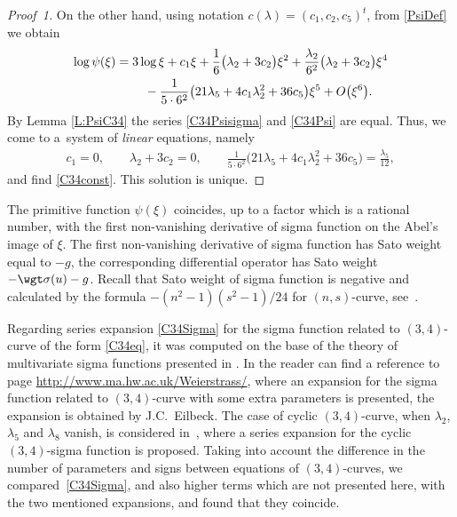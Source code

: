 \begin{proof}[Proof~1]
On the other hand, using notation $c(\lambda)=(c_1,c_2,c_5)^t$, from \eqref{PsiDef} we obtain
\begin{gather}
 \log \psi(\xi) = 3 \log \xi + c_1 \xi + \frac{1}{6} \big(\lambda_2+3c_2 \big) \xi^2
 + \frac{\lambda_2}{6^2} \big(\lambda_2+3 c_2 \big) \xi^4\nonumber\\
 \hphantom{\log \psi(\xi) =}{} - \frac{1}{5\cdot 6^2} \big(21\lambda_5 +4 c_1 \lambda_2^2 + 36 c_5\big)\xi^5 + O\big(\xi^6\big).\label{C34Psi}
\end{gather}
By Lemma \ref{L:PsiC34} the series \eqref{C34Psisigma} and \eqref{C34Psi} are equal. Thus, we come to a~system of \emph{linear} equations, namely
\begin{gather*}
 c_1 = 0,\qquad \lambda_2+3c_2 =0,\qquad \frac{1}{5\cdot 6^2} \big(21\lambda_5 + 4 c_1 \lambda_2^2 + 36 c_5\big)= \frac{\lambda_5}{12},
\end{gather*}
and find \eqref{C34const}. {This solution is unique.}
\end{proof}

\begin{Remark}\label{R:SigmaDer} The primitive function $\psi(\xi)$ coincides, up to a factor which is a rational number, with the first non-vanishing derivative of sigma function on the Abel's image of $\xi$. The first non-vanishing derivative of sigma function has Sato weight equal to $-g$, the corresponding differential operator has Sato weight $-\wgt \sigma (u)-g$. Recall that Sato weight of sigma function is negative and calculated by the formula $-(n^2-1)(s^2-1)/24$ for $(n,s)$-curve, see~\cite{BEL1999}.
\end{Remark}
\begin{Remark}\label{R:SigmaExpansion}
Regarding series expansion \eqref{C34Sigma} for the sigma function related to $(3,4)$-curve of the form \eqref{C34eq}, it was computed on the base of the theory of multivariate sigma functions presented in \cite{BL2004,BL2008}. In \cite[ref.~15]{EEMOP2007} the reader can find a reference to page \url{http://www.ma.hw.ac.uk/Weierstrass/}, where an expansion for the sigma function related to $(3,4)$-curve with some extra parameters is presented, the expansion is obtained by J.C.~Eilbeck. The case of cyclic $(3,4)$-curve, when $\lambda_2$, $\lambda_5$ and $\lambda_8$ vanish, is considered in~\cite{EEMOP2007}, %
where a series expansion for the cyclic $(3,4)$-sigma function is proposed. Taking into account the difference in the number of parameters and signs between equations of $(3,4)$-curves, we compared~\eqref{C34Sigma}, and also higher terms which are not presented here, with the two mentioned expansions, and found that they coincide.
\end{Remark}

